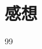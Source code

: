 \documentclass[autodetect-engine,dvi=dvipdfmx,ja=standard,
               a4j,11pt]{bxjsarticle}
\begin{document}


\section{感想}


\begin{thebibliography}{99}
\end{thebibliography}

\end{document}
